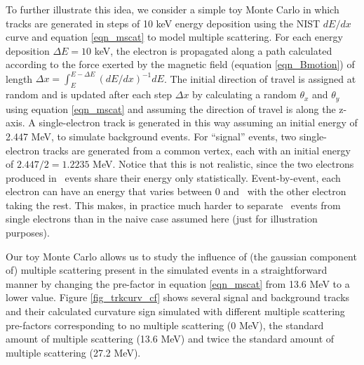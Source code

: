 \documentclass{JINST}
\begin{document}
To further illustrate this idea, we consider a simple toy Monte Carlo in which tracks are generated in steps of 10 keV energy
deposition using the NIST $dE/dx$ curve and equation \ref{eqn_mscat} to model multiple scattering.  For each energy 
deposition $\Delta E = 10$ keV, the electron is propagated along a path calculated according to the force exerted
by the magnetic field (equation \ref{eqn_Bmotion}) of length $\Delta x = \int_{E}^{E-\Delta E}(dE/dx)^{-1}dE$.   The
initial direction of travel is assigned at random and is updated after each step $\Delta x$ 
by calculating a random $\theta_x$ and $\theta_y$ using equation \ref{eqn_mscat} and
assuming the direction of travel is along the z-axis.  A single-electron track is generated in this way 
assuming an initial energy of 2.447 MeV, to simulate background events.  For ``signal'' events, two 
single-electron tracks are generated from a common vertex, each with an initial energy of $2.447/2 = 1.2235$ MeV. Notice that this is not realistic, since the two electrons produced in \bbonu\ events share their energy only statistically. Event-by-event, each electron can have an energy that varies between 0 and \Qbb\, with the other electron taking the rest. This makes, in practice much harder to separate \bbonu\ events from single electrons than in the naive case assumed here (just for illustration purposes).

Our toy Monte Carlo allows us to study the influence of (the gaussian component of) multiple scattering present in the simulated events in a
straightforward manner by changing the pre-factor in equation \ref{eqn_mscat} from 13.6 MeV to a lower value.  
Figure \ref{fig_trkcurv_cf} shows several signal and background tracks and their calculated curvature sign 
simulated with different multiple scattering pre-factors corresponding to no multiple scattering (0 MeV), the 
standard amount of multiple scattering (13.6 MeV) and twice the standard amount of multiple scattering (27.2 
MeV).  
\end{document}

